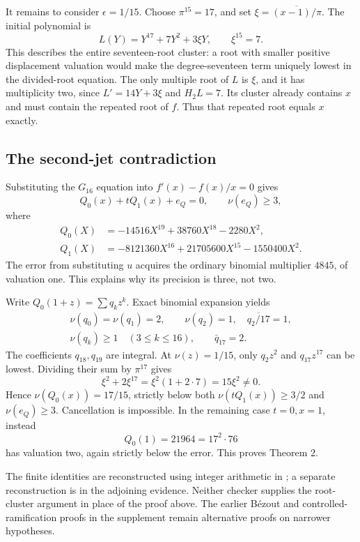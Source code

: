 \documentclass[
  british,
  10pt,
  a4paper,
]{article}
\begin{document}
It remains to consider \(\epsilon=1/15\). Choose \(\pi^{15}=17\), and
set \(\xi=\overline{(x-1)/\pi}\). The initial polynomial is \[
L(Y)=Y^{17}+7Y^2+3\xi Y,
\qquad \xi^{15}=7.
\] This describes the entire seventeen-root cluster: a root with smaller
positive displacement valuation would make the degree-seventeen term
uniquely lowest in the divided-root equation. The only multiple root of
\(L\) is \(\xi\), and it has multiplicity two, since \(L'=14Y+3\xi\) and
\(H_2L=7\). Its cluster already contains \(x\) and must contain the
repeated root of \(f\). Thus that repeated root equals \(x\) exactly.

\subsection{The second-jet
contradiction}\label{the-second-jet-contradiction}

Substituting the \(G_{16}\) equation into \(f'(x)-f(x)/x=0\) gives \[
Q_0(x)+tQ_1(x)+e_Q=0,\qquad \nu(e_Q)\ge3,
\] where \[
\begin{aligned}
Q_0(X)&=-14516X^{19}+38760X^{18}-2280X^2,\\
Q_1(X)&=-8121360X^{16}+21705600X^{15}-1550400X^2.
\end{aligned}
\] The error from substituting \(u\) acquires the ordinary binomial
multiplier \(4845\), of valuation one. This explains why its precision
is three, not two.

Write \(Q_0(1+z)=\sum q_kz^k\). Exact binomial expansion yields \[
\begin{gathered}
\nu(q_0)=\nu(q_1)=2,\qquad
\nu(q_2)=1,\quad \overline{q_2/17}=1,\\
\nu(q_k)\ge1\quad(3\le k\le16),\qquad
\bar q_{17}=2.
\end{gathered}
\] The coefficients \(q_{18},q_{19}\) are integral. At \(\nu(z)=1/15\),
only \(q_2z^2\) and \(q_{17}z^{17}\) can be lowest. Dividing their sum
by \(\pi^{17}\) gives \[
\xi^2+2\xi^{17}=\xi^2(1+2\cdot7)=15\xi^2\ne0.
\] Hence \(\nu(Q_0(x))=17/15\), strictly below both
\(\nu(tQ_1(x))\ge3/2\) and \(\nu(e_Q)\ge3\). Cancellation is impossible.
In the remaining case \(t=0,x=1\), instead \[
Q_0(1)=21964=17^2\cdot76
\] has valuation two, again strictly below the error. This proves
Theorem 2.

The finite identities are reconstructed using integer arithmetic in
; a
separate reconstruction is in the adjoining evidence. Neither checker
supplies the root-cluster argument in place of the proof above. The
earlier Bézout and controlled-ramification proofs in the supplement
remain alternative proofs on narrower hypotheses.
\end{document}

